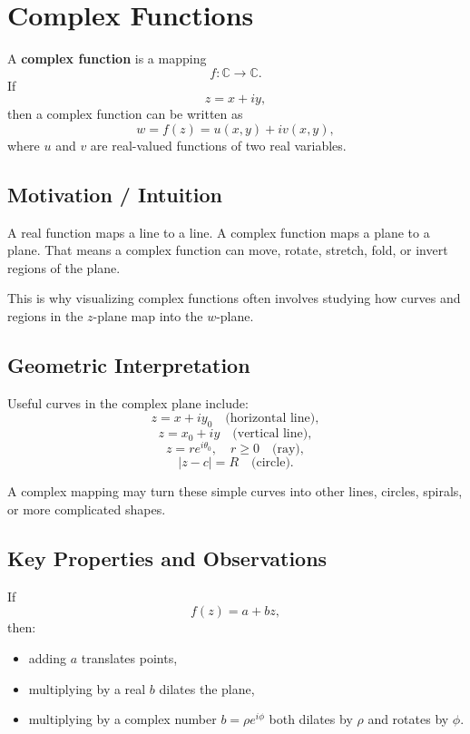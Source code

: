 
\section{Complex Functions}

\begin{conceptbox}
    A \textbf{complex function} is a mapping
    \[
        f:\mathbb{C}\to\mathbb{C}.
    \]
    If
    \[
        z=x+iy,
    \]
    then a complex function can be written as
    \[
        w=f(z)=u(x,y)+iv(x,y),
    \]
    where $u$ and $v$ are real-valued functions of two real variables.
\end{conceptbox}

\subsection*{Motivation / Intuition}

A real function maps a line to a line. A complex function maps a plane to a plane. That means a complex function can move, rotate, stretch, fold, or invert regions of the plane.

This is why visualizing complex functions often involves studying how curves and regions in the $z$-plane map into the $w$-plane.

\subsection*{Geometric Interpretation}

Useful curves in the complex plane include:
\[
    z=x+iy_0 \quad \text{(horizontal line)},
\]
\[
    z=x_0+iy \quad \text{(vertical line)},
\]
\[
    z=re^{i\theta_0}, \quad r\ge 0 \quad \text{(ray)},
\]
\[
    |z-c|=R \quad \text{(circle)}.
\]

A complex mapping may turn these simple curves into other lines, circles, spirals, or more complicated shapes.

\subsection*{Key Properties and Observations}

\begin{conceptbox}
    If
    \[
        f(z)=a+bz,
    \]
    then:
    \begin{itemize}
        \item adding $a$ translates points,
        \item multiplying by a real $b$ dilates the plane,
        \item multiplying by a complex number $b=\rho e^{i\phi}$ both dilates by $\rho$ and rotates by $\phi$.
    \end{itemize}
\end{conceptbox}

